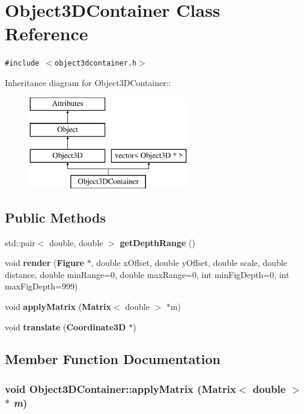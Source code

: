 \section{Object3DContainer Class Reference}
\label{classObject3DContainer}
{\tt \#include $<$object3dcontainer.h$>$}

Inheritance diagram for Object3DContainer::\begin{figure}[H]
\begin{center}
\leavevmode
\includegraphics[height=4cm]{classObject3DContainer}
\end{center}
\end{figure}
\subsection*{Public Methods}
\begin{CompactItemize}
\item 
std::pair$<$ double, double $>$ {\bf get\-Depth\-Range} ()
\item 
void {\bf render} ({\bf Figure} $\ast$, double x\-Offset, double y\-Offset, double scale, double distance, double min\-Range=0, double max\-Range=0, int min\-Fig\-Depth=0, int max\-Fig\-Depth=999)
\item 
void {\bf apply\-Matrix} ({\bf Matrix}$<$ double $>$ $\ast$m)
\item 
void {\bf translate} ({\bf Coordinate3D} $\ast$)
\end{CompactItemize}


\subsection{Member Function Documentation}
\subsubsection{\setlength{\rightskip}{0pt plus 5cm}void Object3DContainer::apply\-Matrix ({\bf Matrix}$<$ double $>$ $\ast$ {\em m})\hspace{0.3cm}{\tt  [virtual]}}\label{classObject3DContainer_a2}




